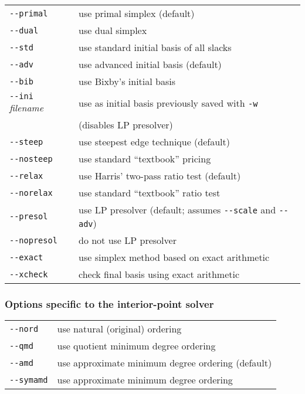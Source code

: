 \noindent
\begin{tabular}{@{}p{30mm}p{92.3mm}@{}}
\verb|--primal|   &  use primal simplex (default) \\
\verb|--dual|     &  use dual simplex \\
\verb|--std|      &  use standard initial basis of all slacks \\
\verb|--adv|      &  use advanced initial basis (default) \\
\verb|--bib|      &  use Bixby's initial basis\\
\verb|--ini| {\it filename}
                  &  use as initial basis previously saved with
                     \verb|-w| \\
                  & (disables LP presolver) \\
\verb|--steep|    &  use steepest edge technique (default) \\
\verb|--nosteep|  &  use standard ``textbook'' pricing \\
\verb|--relax|    &  use Harris' two-pass ratio test (default) \\
\verb|--norelax|  &  use standard ``textbook'' ratio test \\
\verb|--presol|   &  use LP presolver (default; assumes \verb|--scale|
                     and \verb|--adv|) \\
\verb|--nopresol| &  do not use LP presolver \\
\verb|--exact|    & use simplex method based on exact arithmetic \\
\verb|--xcheck|   & check final basis using exact arithmetic \\
\end{tabular}

\subsubsection*{Options specific to the interior-point solver}

\noindent
\begin{tabular}{@{}p{30mm}p{92.3mm}@{}}
\verb|--nord|     &  use natural (original) ordering \\
\verb|--qmd|      &  use quotient minimum degree ordering \\
\verb|--amd|      &  use approximate minimum degree ordering (default)\\
\verb|--symamd|   &  use approximate minimum degree ordering \\
\end{tabular}

